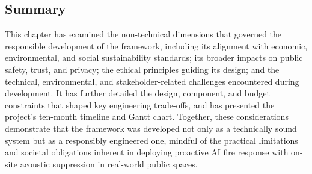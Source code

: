 \subsection{Summary}

This chapter has examined the non-technical dimensions that governed the responsible development of the framework, including its alignment with economic, environmental, and social sustainability standards; its broader impacts on public safety, trust, and privacy; the ethical principles guiding its design; and the technical, environmental, and stakeholder-related challenges encountered during development. It has further detailed the design, component, and budget constraints that shaped key engineering trade-offs, and has presented the project's ten-month timeline and Gantt chart. Together, these considerations demonstrate that the framework was developed not only as a technically sound system but as a responsibly engineered one, mindful of the practical limitations and societal obligations inherent in deploying proactive AI fire response with on-site acoustic suppression in real-world public spaces.
